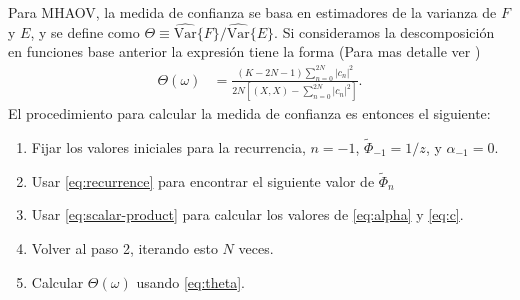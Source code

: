 Para MHAOV, la medida de confianza se basa en estimadores de la varianza de $F$ y $E$, y se define como $\Theta \equiv \widehat{\mbox{Var}} \{F\}/\widehat{\mbox{Var}} \{E\}$. Si consideramos la descomposición en funciones base anterior la expresión tiene la forma (Para mas detalle ver \cite{MHAOV})
\begin{align}
    \Theta(\omega) &= \frac{(K - 2N - 1) \sum_{n=0}^{2N} |c_n|^2}{2N[(X,X)- \sum_{n=0}^{2N} |c_n|^2]} \label{eq:theta} 
.\end{align}
El procedimiento para calcular la medida de confianza es entonces el siguiente:
\begin{enumerate}
    \item Fijar los valores iniciales para la recurrencia, $n=-1$, $\tilde{\Phi}_{-1} = 1/z$, y $\alpha_{-1}=0$.
    \item Usar \eqref{eq:recurrence} para encontrar el siguiente valor de $\tilde{\Phi}_n$
    \item Usar \eqref{eq:scalar-product} para calcular los valores de \eqref{eq:alpha} y \eqref{eq:c}.
    \item Volver al paso 2, iterando esto $N$ veces.
    \item Calcular $\Theta(\omega)$ usando \ref{eq:theta}.
\end{enumerate}
    
